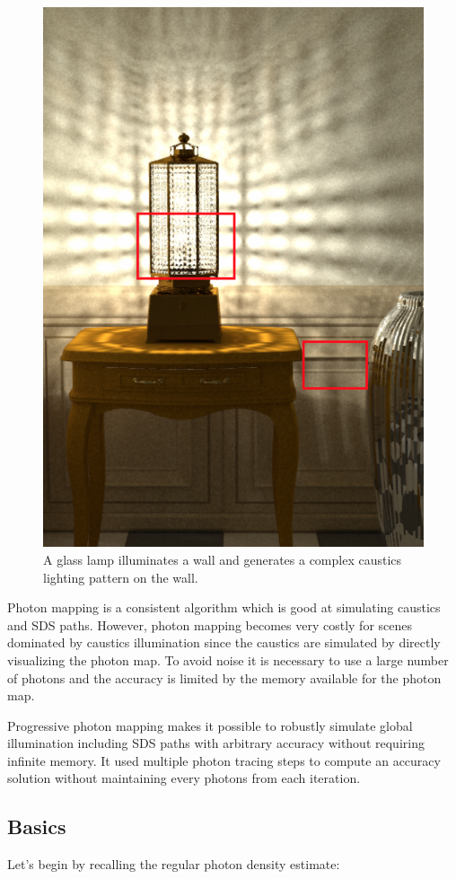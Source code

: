 \begin{figure}
\sidecaption
	\includegraphics[width=.65\textwidth]{graphics/pm/pm-21}
	\caption{A glass lamp illuminates a wall and generates a complex caustics lighting pattern on the wall.}
	\label{f:complex-caustics}
\end{figure}

Photon mapping is a consistent algorithm which is good at simulating caustics and SDS paths. However, photon mapping becomes very costly for scenes dominated by caustics illumination since the caustics are simulated by directly visualizing the photon map. To avoid noise it is necessary to use a large number of photons and the accuracy is limited by the memory available for the photon map.

Progressive photon mapping\cite{a:ProgressivePhotonMapping} makes it possible to robustly simulate global illumination including SDS paths with arbitrary accuracy without requiring infinite memory. It used multiple photon tracing steps to compute an accuracy solution without maintaining every photons from each iteration. 




\subsection{Basics}
Let's begin by recalling the regular photon density estimate:

